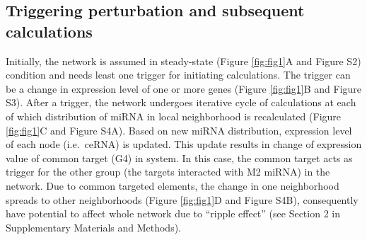 \documentclass[a4,center,fleqn]{NAR}
\begin{document}
\subsection{Triggering perturbation and subsequent calculations}

Initially, the network is assumed in steady-state (Figure
\ref{fig:fig1}A and Figure S2) condition and needs least one trigger for
initiating calculations. The trigger can be a change in expression level
of one or more genes (Figure \ref{fig:fig1}B and Figure S3). After a
trigger, the network undergoes iterative cycle of calculations at each
of which distribution of miRNA in local neighborhood is recalculated
(Figure \ref{fig:fig1}C and Figure S4A). Based on new miRNA
distribution, expression level of each node (i.e.~ceRNA) is updated.
This update results in change of expression value of common target (G4)
in system. In this case, the common target acts as trigger for the other
group (the targets interacted with M2 miRNA) in the network. Due to
common targeted elements, the change in one neighborhood spreads to
other neighborhoods (Figure \ref{fig:fig1}D and Figure S4B),
consequently have potential to affect whole network due to ``ripple
effect'' (see Section 2 in Supplementary Materials and Methods).
\end{document}
